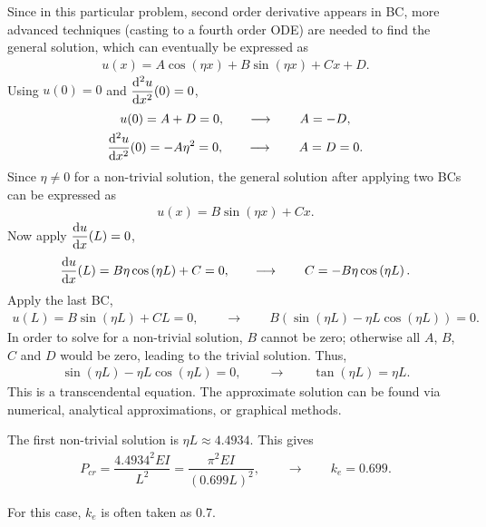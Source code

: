 \begin{solution}
Since in this particular problem, second order derivative appears in BC, more advanced techniques (casting to a fourth order ODE) are needed to find the general solution, which can eventually be expressed as
\begin{gather*}
u(x)=A\cos\left(\eta{}x\right)+B\sin\left(\eta{}x\right)+Cx+D.
\end{gather*}
Using $u(0)=0$ and $\dfrac{\mathrm{d}^2u}{\mathrm{d}x^2}(0)=0$,
\begin{gather*}
u(0)=A+D=0,\qquad\longrightarrow\qquad{}A=-D,\\
\dfrac{\mathrm{d}^2u}{\mathrm{d}x^2}(0)=-A\eta^2=0,\qquad\longrightarrow\qquad{}A=D=0.
\end{gather*}
Since $\eta\neq0$ for a non-trivial solution, the general solution after applying two BCs can be expressed as
\begin{gather*}
u(x)=B\sin\left(\eta{}x\right)+Cx.
\end{gather*}
Now apply $\dfrac{\mathrm{d}u}{\mathrm{d}x}(L)=0$,
\begin{gather*}
\dfrac{\mathrm{d}u}{\mathrm{d}x}(L)=B\eta\cos\left(\eta{}L\right)+C=0,\qquad\longrightarrow\qquad{}C=-B\eta\cos\left(\eta{}L\right).
\end{gather*}
Apply the last BC,
\begin{gather*}
u(L)=B\sin\left(\eta{}L\right)+CL=0,\qquad\longrightarrow\qquad{}B\left(\sin\left(\eta{}L\right)-\eta{}L\cos\left(\eta{}L\right)\right)=0.
\end{gather*}
In order to solve for a non-trivial solution, $B$ cannot be zero; otherwise all $A$, $B$, $C$ and $D$ would be zero, leading to the trivial solution.
Thus,
\begin{gather*}
\sin\left(\eta{}L\right)-\eta{}L\cos\left(\eta{}L\right)=0,\qquad\longrightarrow\qquad{}
\tan\left(\eta{}L\right)=\eta{}L.
\end{gather*}
This is a transcendental equation.
The approximate solution can be found via numerical, analytical approximations, or graphical methods.
\begin{figure}[H]
\centering
\end{figure}
The first non-trivial solution is $\eta{}L\approx4.4934$.
This gives
\begin{gather*}
P_{cr}=\dfrac{4.4934^2EI}{L^2}=\dfrac{\pi^2EI}{\left(0.699L\right)^2},\qquad\longrightarrow\qquad{}k_e=0.699.
\end{gather*}

For this case, $k_e$ is often taken as \num{0.7}.
\end{solution}

